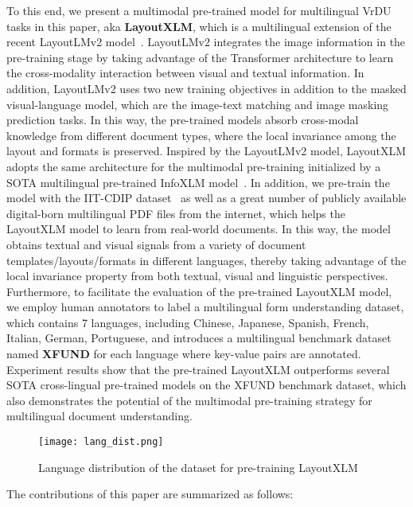 \documentclass[11pt]{article}
\newcommand{\task}{\textsc{XFUND}\xspace}
\begin{document}
To this end, we present a multimodal pre-trained model for multilingual VrDU tasks in this paper, aka \textbf{LayoutXLM}, which is a multilingual extension of the recent LayoutLMv2 model~\citep{xu2020layoutlmv2}. LayoutLMv2 integrates the image information in the pre-training stage by taking advantage of the Transformer architecture to learn the cross-modality interaction between visual and textual information.
In addition, LayoutLMv2 uses two new training objectives in addition to the masked visual-language model, which are the image-text matching and image masking prediction tasks. In this way, the pre-trained models absorb cross-modal knowledge from different document types, where the local invariance among the layout and formats is preserved. Inspired by the LayoutLMv2 model, LayoutXLM adopts the same architecture for the multimodal pre-training initialized by a SOTA multilingual pre-trained InfoXLM model~\citep{chi2020infoxlm}. In addition, we pre-train the model with the IIT-CDIP dataset~\citep{10.1145/1148170.1148307} as well as a great number of publicly available digital-born multilingual PDF files from the internet, which helps the LayoutXLM model to learn from real-world documents. In this way, the model obtains textual and visual signals from a variety of document templates/layouts/formats in different languages, thereby taking advantage of the local invariance property from both textual, visual and linguistic perspectives. Furthermore, to facilitate the evaluation of the pre-trained LayoutXLM model, we employ human annotators to label a multilingual form understanding dataset, which contains 7 languages, including Chinese, Japanese, Spanish, French, Italian, German, Portuguese, and introduces a multilingual benchmark dataset named \textbf{\task} for each language where key-value pairs are annotated. Experiment results show that the pre-trained LayoutXLM outperforms several SOTA cross-lingual pre-trained models on the \task benchmark dataset, which also demonstrates the potential of the multimodal pre-training strategy for multilingual document understanding.

\begin{figure*}[t]
  \centering
  \texttt{[image: lang\_dist.png]}
  \caption{Language distribution of the dataset for pre-training LayoutXLM}
  \label{fig:lang_dist}
\end{figure*}
    

The contributions of this paper are summarized as follows:
\end{document}

